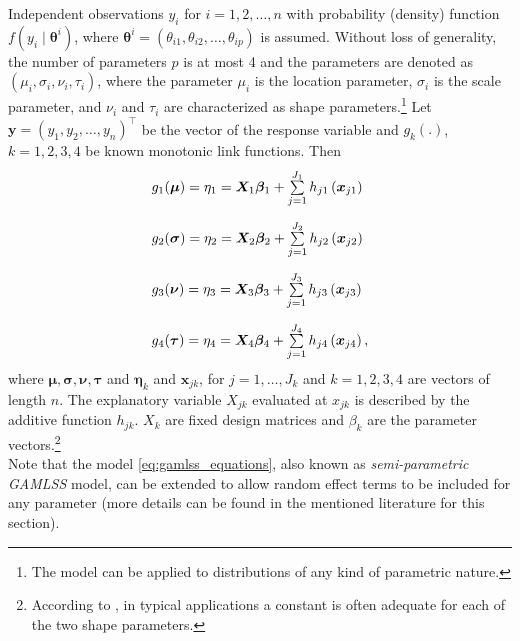 Independent observations $y_i$ for $i=1,2,\ldots,n$ with probability (density) function $f\left(y_{i} \mid \boldsymbol{\theta}^{i}\right)$, where $\boldsymbol{\theta}^{i}=\left(\theta_{i 1}, \theta_{i 2}, \ldots, \theta_{i p}\right)$ is assumed. Without loss of generality, the number of parameters $p$ is at most 4 and the parameters are denoted as $\left(\mu_{i}, \sigma_{i}, \nu_{i}, \tau_{i}\right)$, where the parameter $\mu_i$ is the location parameter, $\sigma_i$ is the scale parameter, and $\nu_i$ and $\tau_i$ are characterized as shape parameters.\footnote{The model can be applied to distributions of any kind of parametric nature.} Let $\mathbf{y}=\left(y_{1}, y_{2}, \ldots, y_{n}\right)^{\top}$ be the vector of the response variable and $g_k(.)$, $k = 1,2,3,4$ be known monotonic link functions. Then 
\begin{equation}
\begin{array}{l}
g_{1}(\boldsymbol{\mu})=\eta_{1}=\mathbf{X}_{1} \boldsymbol{\beta}_{1}+\sum\limits_{j=1}^{J_{1}} h_{j 1}\left(\mathbf{x}_{j 1}\right) \\ \noalign{\vskip10pt}
g_{2}(\boldsymbol{\sigma})=\eta_{2}=\mathbf{X}_{2} \boldsymbol{\beta}_{2}+\sum\limits_{j=1}^{J_{2}} h_{j 2}\left(\mathbf{x}_{j 2}\right) \\ \noalign{\vskip10pt}
g_{3}(\boldsymbol{\nu})=\eta_{3}=\mathbf{X}_{3} \boldsymbol{\beta}_{3}+\sum\limits_{j=1}^{J_{3}} h_{j 3}\left(\mathbf{x}_{j 3}\right) \\ \noalign{\vskip10pt}
g_{4}(\boldsymbol{\tau})=\eta_{4}=\mathbf{X}_{4} \boldsymbol{\beta}_{4}+\sum\limits_{j=1}^{J_{4}} h_{j 4}\left(\mathbf{x}_{j 4}\right),
\end{array}
\label{eq:gamlss_equations}
\end{equation}
where $\bm{\mu}, \bm{\sigma}, \bm{\nu}, \bm{\tau}$ and $\bm{\eta}_k$ and $\bm{x}_{jk}$, for $j=1,\ldots,J_k$ and $k=1,2,3,4$ are vectors of length $n$. The explanatory variable $X_{jk}$ evaluated at $x_{jk}$ is described by the additive function $h_{jk}$. $X_k$ are fixed design matrices and $\beta_k$ are the parameter vectors.\footnote{According to \cite{stasinopoulos2007generalized}, in typical applications a constant is often adequate for each of the two shape parameters.}
\\
Note that the model \ref{eq:gamlss_equations}, also known as \textit{semi-parametric \ac{GAMLSS}} model, can be extended to allow random effect terms to be included for any parameter (more details can be found in the mentioned literature for this section).














